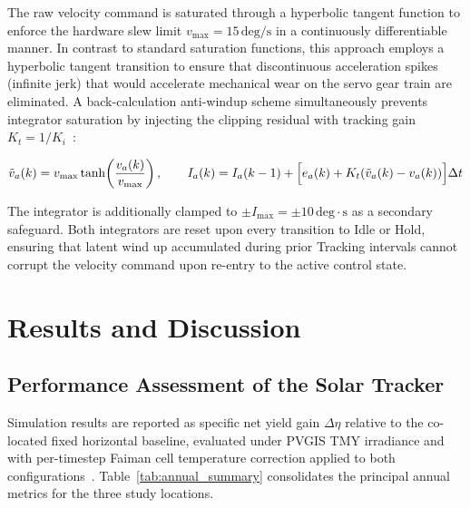 \documentclass[preprint,3p,12pt]{elsarticle}
\newcommand{\dt}{\Delta t}
\begin{document}
The raw velocity command is saturated through a hyperbolic tangent function to enforce the hardware slew limit $v_{\max} = 15\,\mathrm{deg/s}$ in a continuously differentiable manner. In contrast to standard saturation functions, this approach employs a hyperbolic tangent transition to ensure that discontinuous acceleration spikes (infinite jerk) that would accelerate mechanical wear on the servo gear train are eliminated. A back-calculation anti-windup scheme simultaneously prevents integrator saturation by injecting the clipping residual with tracking gain $K_t = 1/K_i$~\cite{Astrom1995book}:

\begin{equation}
    \tilde{v}_a(k) = v_{\max}\tanh\!\left(\frac{v_a(k)}{v_{\max}}\right), \qquad
    I_a(k) = I_a(k-1) + \Bigl[ e_a(k) + K_t\!\left(\tilde{v}_a(k) - v_a(k)\right) \Bigr] \dt
    \label{eq:sat_and_windup}
\end{equation}

The integrator is additionally clamped to $\pm I_{\max} = \pm10\,\mathrm{deg\cdot s}$ as a secondary safeguard. Both integrators are reset upon every transition to Idle or Hold, ensuring that latent wind up accumulated during prior Tracking intervals cannot corrupt the velocity command upon re-entry to the active control state.


\section{Results and Discussion}
\label{sec:results}

\subsection{Performance Assessment of the Solar Tracker}
\label{sec:results_yield}

Simulation results are reported as specific net yield gain $\Delta\eta$
relative to the co-located fixed horizontal baseline, evaluated under
PVGIS TMY irradiance and with per-timestep Faiman cell temperature
correction applied to both configurations~\cite{Faiman2008}.
Table~\ref{tab:annual_summary} consolidates the principal annual
metrics for the three study locations.
\end{document}
